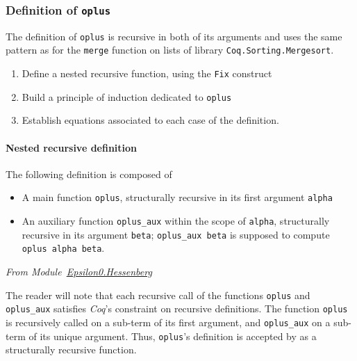     \subsubsection{Definition of \texttt{oplus}}
    \label{sec:orgheadline84}

    The definition of \texttt{oplus} is recursive in both of its 
    arguments and uses  the same pattern as for the \texttt{merge} function on lists of library
    \texttt{Coq.Sorting.Mergesort}.

    \begin{enumerate}
    \item Define a nested recursive function, using the \texttt{Fix} 
        construct

    \item Build a principle of induction dedicated to \texttt{oplus}

    \item Establish equations associated to each case of the definition.
    \end{enumerate}

    \paragraph{Nested recursive definition}
    \label{sec:orgheadline83}

    The following definition is composed of 
    \begin{itemize}
    \item A main function \texttt{oplus}, structurally recursive in its 
    first argument \texttt{alpha}
    \item An auxiliary function \texttt{oplus\_aux} within the scope of \texttt{alpha},
    structurally recursive in its argument \texttt{beta};  \texttt{oplus\_aux beta} 
       is supposed to compute  \texttt{oplus alpha beta}.
    \end{itemize}
      
  \vspace{4pt}
    \emph{From Module~\href{../theories/html/hydras.Epsilon0.Hessenberg.html\#oplus}{Epsilon0.Hessenberg}}

    \label{sect:infix-oplus}

    
    
 
    The reader will note that each recursive call of the functions
    \texttt{oplus} and \texttt{oplus\_aux} satisfies \emph{Coq}'s constraint
    on recursive definitions. The function \texttt{oplus} is recursively called on a sub-term of its first argument,
    and \texttt{oplus\_aux} on a sub-term of its unique argument.
    Thus, \texttt{oplus}'s definition is accepted by \coq{} as a structurally recursive function.

